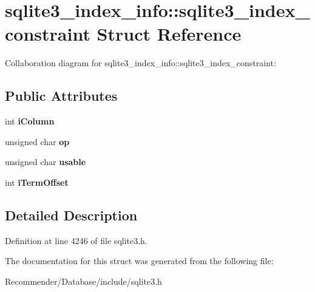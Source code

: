\section{sqlite3\_\-index\_\-info::sqlite3\_\-index\_\-constraint Struct Reference}
\label{structsqlite3__index__info_1_1sqlite3__index__constraint}
Collaboration diagram for sqlite3\_\-index\_\-info::sqlite3\_\-index\_\-constraint:\subsection*{Public Attributes}
\begin{CompactItemize}
\item 
int {\bf iColumn}\label{structsqlite3__index__info_1_1sqlite3__index__constraint_64afc1df38f1cd02b956e9dd963c0b97}

\item 
unsigned char {\bf op}\label{structsqlite3__index__info_1_1sqlite3__index__constraint_6ead9d3dc9996f54a7248ea8a2d0bdb7}

\item 
unsigned char {\bf usable}\label{structsqlite3__index__info_1_1sqlite3__index__constraint_2cd12922598daeddd0423ba5584d2963}

\item 
int {\bf iTermOffset}\label{structsqlite3__index__info_1_1sqlite3__index__constraint_d4e37755bdeacac9de989cdf27415e48}

\end{CompactItemize}


\subsection{Detailed Description}




Definition at line 4246 of file sqlite3.h.

The documentation for this struct was generated from the following file:\begin{CompactItemize}
\item 
Recommender/Database/include/sqlite3.h\end{CompactItemize}
